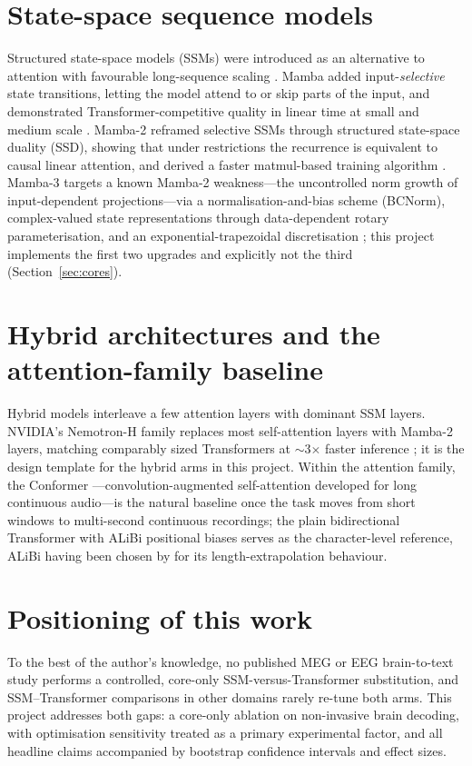 \documentclass[11pt,a4paper]{report}
\begin{document}
\section{State-space sequence models}
Structured state-space models (SSMs) were introduced as an alternative to
attention with favourable long-sequence scaling \citep{gu2021s4}. Mamba
added input-\emph{selective} state transitions, letting the model attend to
or skip parts of the input, and demonstrated Transformer-competitive quality
in linear time at small and medium scale \citep{gu2023mamba}. Mamba-2
reframed selective SSMs through structured state-space duality (SSD),
showing that under restrictions the recurrence is equivalent to causal linear
attention, and derived a faster matmul-based training algorithm
\citep{dao2024transformers}. Mamba-3 targets a known Mamba-2 weakness---the
uncontrolled norm growth of input-dependent projections---via a
normalisation-and-bias scheme (BCNorm), complex-valued state representations
through data-dependent rotary parameterisation, and an exponential-trapezoidal
discretisation \citep{lahoti2026mamba3}; this project implements the first
two upgrades and explicitly not the third (Section~\ref{sec:cores}).

\section{Hybrid architectures and the attention-family baseline}
Hybrid models interleave a few attention layers with dominant SSM layers.
NVIDIA's Nemotron-H family replaces most self-attention layers with Mamba-2
layers, matching comparably sized Transformers at $\sim$3$\times$ faster
inference \citep{nvidia2025nemotronh}; it is the design template for the
hybrid arms in this project. Within the attention family, the Conformer
\citep{gulati2020conformer}---convolution-augmented self-attention developed
for long continuous audio---is the natural baseline once the task moves from
short windows to multi-second continuous recordings; the plain bidirectional
Transformer with ALiBi positional biases \citep{press2021alibi} serves as the
character-level reference, ALiBi having been chosen by
\citet{levy2025brain2qwerty} for its length-extrapolation behaviour.

\section{Positioning of this work}
To the best of the author's knowledge, no published MEG or EEG brain-to-text
study performs a controlled, core-only SSM-versus-Transformer substitution,
and SSM--Transformer comparisons in other domains rarely re-tune both arms.
This project addresses both gaps: a core-only ablation on non-invasive brain
decoding, with optimisation sensitivity treated as a primary experimental
factor, and all headline claims accompanied by bootstrap confidence intervals
and effect sizes.
\end{document}
